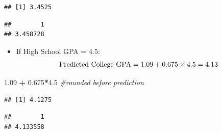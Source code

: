 \documentclass[
]{book}
\newenvironment{Shaded}{\begin{snugshade}}{\end{snugshade}}
\newcommand{\CommentTok}[1]{\textcolor[rgb]{0.56,0.35,0.01}{\textit{#1}}}
\newcommand{\DataTypeTok}[1]{\textcolor[rgb]{0.13,0.29,0.53}{#1}}
\newcommand{\FloatTok}[1]{\textcolor[rgb]{0.00,0.00,0.81}{#1}}
\newcommand{\KeywordTok}[1]{\textcolor[rgb]{0.13,0.29,0.53}{\textbf{#1}}}
\newcommand{\NormalTok}[1]{#1}
\newcommand{\OperatorTok}[1]{\textcolor[rgb]{0.81,0.36,0.00}{\textbf{#1}}}
\newcommand{\StringTok}[1]{\textcolor[rgb]{0.31,0.60,0.02}{#1}}
\providecommand{\tightlist}{%
  \setlength{\itemsep}{0pt}\setlength{\parskip}{0pt}}
\begin{document}
\begin{verbatim}
## [1] 3.4525
\end{verbatim}

\begin{Shaded}
\end{Shaded}

\begin{verbatim}
##        1 
## 3.458728
\end{verbatim}

\begin{itemize}
\tightlist
\item
  If High School GPA = 4.5:\\
  \[ \hbox{Predicted College GPA} = 1.09 + 0.675 \times 4.5 = 4.13 \]
\end{itemize}

\begin{Shaded}
\begin{Highlighting}[]
\FloatTok{1.09} \OperatorTok{+}\StringTok{ }\FloatTok{0.675}\OperatorTok{*}\FloatTok{4.5} \CommentTok{#rounded before prediction}
\end{Highlighting}
\end{Shaded}

\begin{verbatim}
## [1] 4.1275
\end{verbatim}

\begin{Shaded}
\end{Shaded}

\begin{verbatim}
##        1 
## 4.133558
\end{verbatim}
\end{document}

